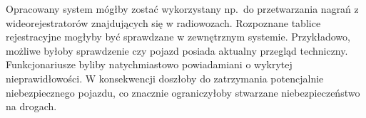 Opracowany system mógłby zostać wykorzystany np.\ do przetwarzania nagrań z wideorejestratorów znajdujących się w radiowozach.
Rozpoznane tablice rejestracyjne mogłyby być sprawdzane w zewnętrznym systemie.
Przykładowo, możliwe byłoby sprawdzenie czy pojazd posiada aktualny przegląd techniczny.
Funkcjonariusze byliby natychmiastowo powiadamiani o wykrytej nieprawidłowości.
W konsekwencji doszłoby do zatrzymania potencjalnie niebezpiecznego pojazdu, co znacznie ograniczyłoby stwarzane niebezpieczeństwo na drogach.

